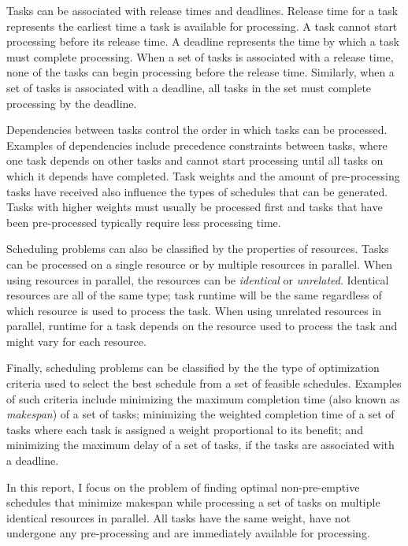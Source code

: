 \documentclass[12pt]{report}
\begin{document}
Tasks can be associated with release times and deadlines.
Release time for a task represents the earliest time a task is available for processing.
A task cannot start processing before its release time.
A deadline represents the time by which a task must complete processing.
When a set of tasks is associated with a release time, none of the tasks can begin processing before the release time.
Similarly, when a set of tasks is associated with a deadline, all tasks in the set must complete processing by the deadline.

Dependencies between tasks control the order in which tasks can be processed.
Examples of dependencies include precedence constraints between tasks, where one task depends on other tasks and cannot start processing until all tasks on which it depends have completed.
Task weights and the amount of pre-processing tasks have received also influence the types of schedules that can be generated.
Tasks with higher weights must usually be processed first and tasks that have been pre-processed typically require less processing time.

Scheduling problems can also be classified by the properties of resources.
Tasks can be processed on a single resource or by multiple resources in parallel.
When using resources in parallel, the resources can be \textit{identical} or \textit{unrelated}.
Identical resources are all of the same type; task runtime will be the same regardless of which resource is used to process the task.
When using unrelated resources in parallel, runtime for a task depends on the resource used to process the task and might vary for each resource.

Finally, scheduling problems can be classified by the the type of optimization criteria used to select the best schedule from a set of feasible schedules.
Examples of such criteria include minimizing the maximum completion time (also known as \textit{makespan}) of a set of tasks; minimizing the weighted completion time of a set of tasks where each task is assigned a weight proportional to its benefit; and minimizing the maximum delay of a set of tasks, if the tasks are associated with a deadline.

In this report, I focus on the problem of finding optimal non-pre-emptive schedules that minimize makespan while processing a set of tasks on multiple identical resources in parallel. All tasks have the same weight, have not undergone any pre-processing and are immediately available for processing.

\end{document}
